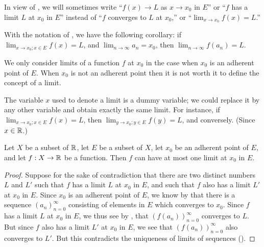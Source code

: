 \begin{note}
  In view of , we will sometimes write ``\(f(x) \to L\) as \(x \to x_0\) in \(E\)'' or ``\(f\) has a limit \(L\) at \(x_0\) in \(E\)'' instead of ``\(f\) converges to \(L\) at \(x_0\),'' or ``\(\lim_{x \to x_0} f(x) = L\).''
\end{note}

\begin{rmk}\label{i:9.3.10}
  With the notation of , we have the following corollary:
  if \(\lim_{x \to x_0 ; x \in E} f(x) = L\), and \(\lim_{n \to \infty} a_n = x_0\), then \(\lim_{n \to \infty} f(a_n) = L\).
\end{rmk}

\begin{rmk}\label{i:9.3.11}
  We only consider limits of a function \(f\) at \(x_0\) in the case when \(x_0\) is an adherent point of \(E\).
  When \(x_0\) is not an adherent point then it is not worth it to define the concept of a limit.
\end{rmk}

\begin{rmk}\label{i:9.3.12}
  The variable \(x\) used to denote a limit is a dummy variable;
  we could replace it by any other variable and obtain exactly the same limit.
  For instance, if \(\lim_{x \to x_0 ; x \in E} f(x) = L\), then \(\lim_{y \to x_0 ; y \in E} f(y) = L\), and conversely.
  (Since \(x \in \mathbb{R}\).)
\end{rmk}

\begin{cor}\label{i:9.3.13}
  Let \(X\) be a subset of \(\mathbb{R}\), let \(E\) be a subset of \(X\), let \(x_0\) be an adherent point of \(E\), and let \(f : X \to \mathbb{R}\) be a function.
  Then \(f\) can have at most one limit at \(x_0\) in \(E\).
\end{cor}

\begin{proof}
  Suppose for the sake of contradiction that there are two distinct numbers \(L\) and \(L'\) such that \(f\) has a limit \(L\) at \(x_0\) in \(E\), and such that \(f\) also has a limit \(L'\) at \(x_0\) in \(E\).
  Since \(x_0\) is an adherent point of \(E\), we know by  that there is a sequence \((a_n)_{n = 0}^\infty\) consisting of elements in \(E\) which converges to \(x_0\).
  Since \(f\) has a limit \(L\) at \(x_0\) in \(E\), we thus see by , that \((f(a_n))_{n = 0}^\infty\) converges to \(L\).
  But since \(f\) also has a limit \(L'\) at \(x_0\) in \(E\), we see that \((f(a_n))_{n = 0}^\infty\) also converges to \(L'\).
  But this contradicts the uniqueness of limits of sequences ().
\end{proof}

